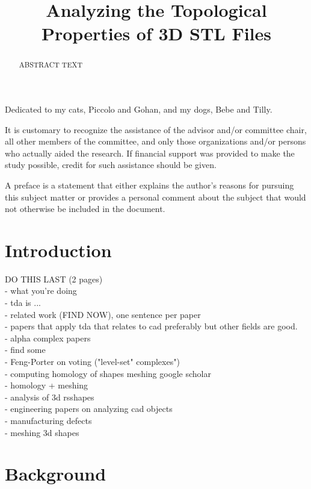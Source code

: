 \documentclass[ma]{uncgdissertationexp}
\title{Analyzing the Topological Properties of 3D STL Files}
\theoremstyle{plain}
\theoremstyle{definition}
\theoremstyle{remark}
\begin{document}
\frontmatter      %
\begin{abstract}
ABSTRACT TEXT
\end{abstract}
\maketitlepage  
\makecopyrightpage
\begin{dedication}
Dedicated to my cats, Piccolo and Gohan, and my dogs, Bebe and Tilly.
\end{dedication}
\makeapprovalpage
\begin{acknowledgments}
It is customary to recognize the assistance of the advisor and/or
committee chair, all other members of the committee, and only those
organizations and/or persons who actually aided the research. If
financial support was provided to make the study possible, credit for
such assistance should be given.
\end{acknowledgments}
\begin{preface}
A preface is a statement that either explains the author's
reasons for pursuing this subject matter or provides a personal
comment about the subject that would not otherwise be included in
the document.
\end{preface}
\tableofcontents
\listoftables
\listoffigures
\mainmatter

\chapter{Introduction}
DO THIS LAST (2 pages)\\
- what you're doing\\
- tda is ...\\
- related work (FIND NOW), one sentence per paper\\
  - papers that apply tda that relates to cad preferably but other fields are good.\\
  - alpha complex papers\\
    - find some\\
    - Feng-Porter on voting ("level-set" complexes")\\
    - computing homology of shapes meshing google scholar\\
    - homology + meshing\\
  - analysis of 3d rsshapes\\
    - engineering papers on analyzing cad objects\\
    - manufacturing defects\\
  - meshing 3d shapes\\

\chapter{Background}
\end{document}
